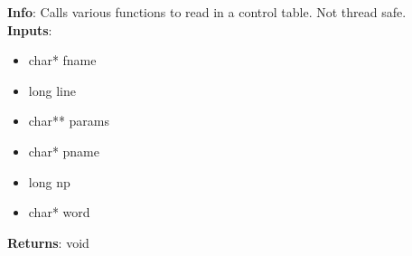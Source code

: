 \textbf{Info}: Calls various functions to read in a control table. Not thread
safe.\\

\noindent \textbf{Inputs}:
\begin{itemize}
\item{char* fname}
\item{long line}
\item{char** params}
\item{char* pname}
\item{long np}
\item{char* word}
\end{itemize}

\noindent \textbf{Returns}: void
